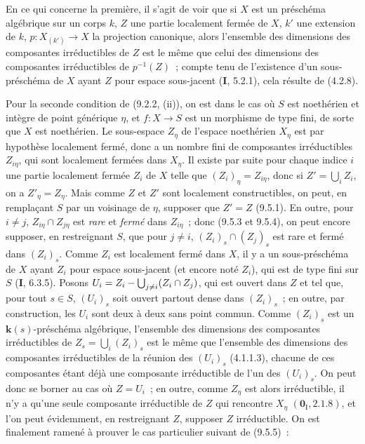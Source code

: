 En ce qui concerne la première, il s'agit de voir que si $X$ est un préschéma
algébrique sur un corps $k$, $Z$ une partie localement fermée de $X$, $k'$ une
extension de $k$, $p:X_{(k')}\to X$ la projection canonique, alors l'ensemble
des dimensions des composantes irréductibles de $Z$ est le même que celui des
dimensions des composantes irréductibles de $p^{-1}(Z)$~; compte tenu de
l'existence d'un sous-préschéma de $X$ ayant $Z$ pour espace sous-jacent
(\textbf{I}, 5.2.1), cela résulte de (4.2.8).

Pour la seconde condition de (9.2.2, (ii)), on est dans le cas où $S$ est
noethérien et intègre de point générique $\eta$, et $f:X\to S$ est un
morphisme de type fini, de sorte que $X$ est noethérien. Le sous-espace
$Z_\eta$ de l'espace noethérien $X_\eta$ est par hypothèse localement fermé,
donc a un nombre fini de composantes irréductibles $Z_{i\eta}$, qui sont
localement fermées dans $X_\eta$. Il existe par suite pour chaque indice $i$
une partie localement fermée $Z_i$ de $X$ telle que $(Z_i)_\eta=Z_{i\eta}$,
donc si $Z'=\bigcup_i Z_i$, on a $Z'_\eta=Z_\eta$. Mais comme $Z$ et $Z'$ sont
localement constructibles, on peut, en remplaçant $S$ par un voisinage de
$\eta$, supposer que $Z'=Z$ (9.5.1). En outre, pour $i\neq j$,
$Z_{i\eta}\cap Z_{j\eta}$ est \emph{rare} et \emph{fermé} dans $Z_{i\eta}$~; donc
(9.5.3 et 9.5.4), on peut encore supposer, en restreignant $S$, que pour
$j\neq i$, $(Z_i)_s\cap(Z_j)_s$ est rare et fermé dans $(Z_i)_s$. Comme $Z_i$
est localement fermé dans $X$, il y a un sous-préschéma de $X$ ayant $Z_i$
pour espace sous-jacent (et encore noté $Z_i$), qui est de type fini sur
$S$ (\textbf{I}, 6.3.5). Posons
$U_i=Z_i-\bigcup_{j\neq i}(Z_i\cap Z_j)$, qui est ouvert dans $Z$ et tel que,
pour tout $s\in S$, $(U_i)_s$ soit ouvert partout dense dans $(Z_i)_s$~; en
outre, par construction, les $U_i$ sont deux à deux sans point commun. Comme
$(Z_i)_s$ est un $\boldsymbol{k}(s)$-préschéma algébrique, l'ensemble des dimensions des
composantes irréductibles de $Z_s=\bigcup_i(Z_i)_s$ est le même que l'ensemble
des dimensions des composantes irréductibles de la réunion des $(U_i)_s$
(4.1.1.3), chacune de ces composantes étant déjà une composante irréductible
de l'un des $(U_i)_s$. On peut donc se borner au cas où $Z=U_i$~; en outre,
comme $Z_\eta$ est alors irréductible, il n'y a qu'une seule composante
irréductible de $Z$ qui rencontre $X_\eta$ $(\mathbf 0_{\mathrm I},2.1.8)$, et
l'on peut évidemment, en restreignant $Z$, supposer $Z$ irréductible. On est
finalement ramené à prouver le cas particulier suivant de (9.5.5)~:

